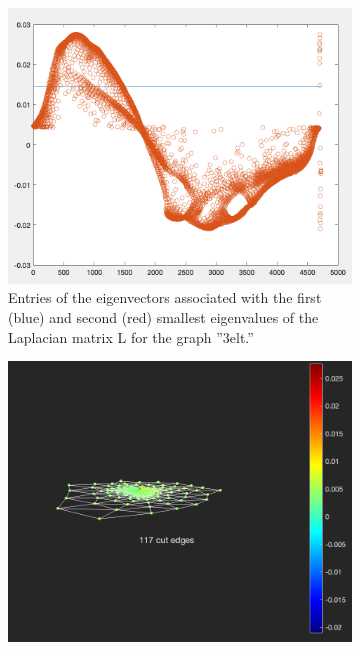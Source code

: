 \documentclass[unicode,11pt,a4paper,oneside,numbers=endperiod,openany]{scrartcl}
\begin{document}
\begin{figure}[H]
        \centering
\begin{subfigure}[b]{0.475\textwidth}   
            \centering 
            \includegraphics[width=\textwidth]{10.png}
            {{\small Entries of the eigenvectors associated with the first (blue) and second (red) smallest eigenvalues of the Laplacian matrix L for the graph ”3elt.”}}    
        \end{subfigure}
        \hfill
        \begin{subfigure}[b]{0.475\textwidth}   
            \centering 
            \includegraphics[width=\textwidth]{11.png}

\end{subfigure}
\end{figure}
\end{document}
